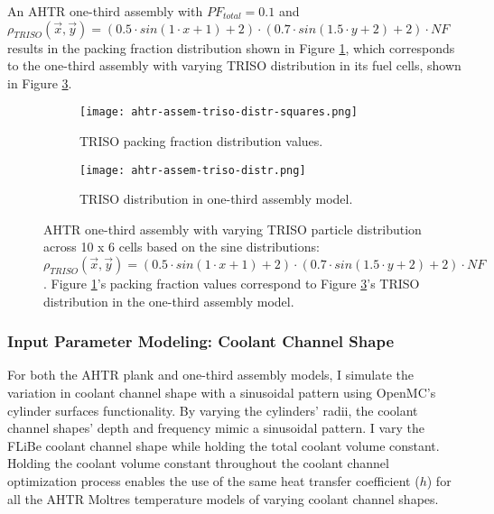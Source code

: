 An \gls{AHTR} one-third assembly with $PF_{total} = 0.1$ and 
$\rho_{TRISO}(\vec{x}, \vec{y}) = \left(0.5\cdot sin(1\cdot x + 1) + 2\right) \cdot 
\left(0.7\cdot sin(1.5\cdot y + 2) + 2\right) \cdot NF$ results in the packing fraction 
distribution shown in Figure \ref{fig:ahtr-assem-triso-distr-squares}, which 
corresponds to the one-third assembly with varying TRISO distribution in its fuel 
cells, shown in Figure \ref{fig:ahtr-assem-triso-distr}. 
\begin{figure}[htbp]
    \begin{subfigure}{0.49\textwidth}
        \centering
        \texttt{[image: ahtr-assem-triso-distr-squares.png]}
        \caption{TRISO packing fraction distribution values.}
        \label{fig:ahtr-assem-triso-distr-squares} 
    \end{subfigure}
    \begin{subfigure}{0.49\textwidth}
        \centering
        \texttt{[image: ahtr-assem-triso-distr.png]}
        \raggedleft
        \caption{TRISO distribution in one-third assembly model.}
        \label{fig:ahtr-assem-triso-distr} 
    \end{subfigure}
    \caption{\acrfull{AHTR} one-third assembly with varying \gls{TRISO} particle 
        distribution across 10 x 6 cells based on the sine distributions: 
        $\rho_{TRISO}(\vec{x}, \vec{y}) = 
        \left(0.5\cdot sin(1\cdot x + 1) + 2\right) \cdot 
        \left(0.7\cdot sin(1.5\cdot y + 2) + 2\right) \cdot NF$. 
        Figure \ref{fig:ahtr-assem-triso-distr-squares}'s packing fraction values 
        correspond to Figure \ref{fig:ahtr-assem-triso-distr}'s  TRISO distribution in 
        the one-third assembly model.}
\end{figure}

\subsubsection{Input Parameter Modeling: Coolant Channel Shape}
For both the \gls{AHTR} plank and one-third assembly models, I simulate the variation in 
coolant channel shape with a sinusoidal pattern using OpenMC's cylinder surfaces
functionality.
By varying the cylinders' radii, the coolant channel shapes' depth and frequency 
mimic a sinusoidal pattern.
I vary the \gls{FLiBe} coolant channel shape while holding the total coolant volume 
constant. 
Holding the coolant volume constant throughout the coolant channel 
optimization process enables the use of the same heat transfer coefficient ($h$)
for all the \gls{AHTR} Moltres temperature models of varying coolant channel shapes.  

